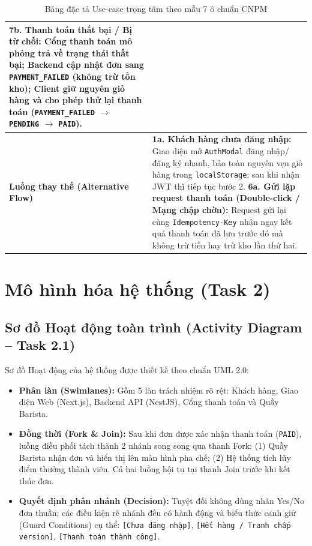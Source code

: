 \documentclass[a4paper,12pt]{article}
\begin{document}
\begin{table}[h!]
\begin{tabularx}{\textwidth}{|p{3.5cm}|X|}
\textbf{7b. Thanh toán thất bại / Bị từ chối:} Cổng thanh toán mô phỏng trả về trạng thái thất bại; Backend cập nhật đơn sang \texttt{PAYMENT\_FAILED} (không trừ tồn kho); Client giữ nguyên giỏ hàng và cho phép thử lại thanh toán (\texttt{PAYMENT\_FAILED} $\rightarrow$ \texttt{PENDING} $\rightarrow$ \texttt{PAID}). \\
\hline
\textbf{Luồng thay thế (Alternative Flow)} & 
\textbf{1a. Khách hàng chưa đăng nhập:} Giao diện mở \texttt{AuthModal} đăng nhập/đăng ký nhanh, bảo toàn nguyên vẹn giỏ hàng trong \texttt{localStorage}; sau khi nhận JWT thì tiếp tục bước 2. \newline
\textbf{6a. Gửi lặp request thanh toán (Double-click / Mạng chập chờn):} Request gửi lại cùng \texttt{Idempotency-Key} nhận ngay kết quả thanh toán đã lưu trước đó mà không trừ tiền hay trừ kho lần thứ hai. \\
\hline
\end{tabularx}
\caption{Bảng đặc tả Use-case trọng tâm theo mẫu 7 ô chuẩn CNPM}
\end{table}

\newpage
\section{Mô hình hóa hệ thống (Task 2)}

\subsection{Sơ đồ Hoạt động toàn trình (Activity Diagram -- Task 2.1)}
Sơ đồ Hoạt động của hệ thống được thiết kế theo chuẩn UML 2.0:
\begin{itemize}
  \item \textbf{Phân làn (Swimlanes):} Gồm 5 làn trách nhiệm rõ rệt: Khách hàng, Giao diện Web (Next.js), Backend API (NestJS), Cổng thanh toán và Quầy Barista.
  \item \textbf{Đồng thời (Fork \& Join):} Sau khi đơn được xác nhận thanh toán (\texttt{PAID}), luồng điều phối tách thành 2 nhánh song song qua thanh Fork: (1) Quầy Barista nhận đơn và hiển thị lên màn hình pha chế; (2) Hệ thống tích lũy điểm thưởng thành viên. Cả hai luồng hội tụ tại thanh Join trước khi kết thúc đơn.
  \item \textbf{Quyết định phân nhánh (Decision):} Tuyệt đối không dùng nhãn Yes/No đơn thuần; các điều kiện rẽ nhánh đều có hành động và biểu thức canh giữ (Guard Conditions) cụ thể: \texttt{[Chưa đăng nhập]}, \texttt{[Hết hàng / Tranh chấp version]}, \texttt{[Thanh toán thành công]}.
\end{itemize}
\end{document}
